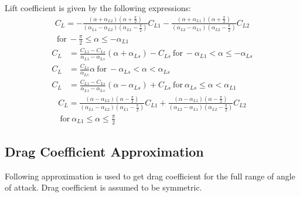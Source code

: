 Lift coefficient is given by the following expressions:
\begin{multline}
  C_L =
  -
  \frac{
    \left( \alpha + \alpha_{L2} \right)
    \left( \alpha + \frac{\pi}{2} \right) 
  }
  {
    \left( \alpha_{L1} - \alpha_{L2} \right)
    \left( \alpha_{L1} - \frac{\pi}{2} \right) 
  } C_{L1}
  -
  \frac{
    \left( \alpha + \alpha_{L1} \right)
    \left( \alpha + \frac{\pi}{2} \right)
  }
  {
    \left( \alpha_{L2} - \alpha_{L1} \right)
    \left( \alpha_{L2} - \frac{\pi}{2} \right)
  } C_{L2} \\
  \mathrm{~for~} -\frac{\pi}{2} \leq \alpha \leq - \alpha_{L1}
\end{multline}
\begin{align}
  C_L &=
  \frac{ C_{L1} - C_{Ls} }{ \alpha_{L1} - \alpha_{Ls} }
  \left( \alpha + \alpha_{Ls} \right) - C_{Ls}
  \mathrm{~for~} - \alpha_{L1} < \alpha \leq - \alpha_{Ls} \\
  C_L &= \frac{C_{Ls}}{\alpha_{Ls}} \alpha
  \mathrm{~for~} - \alpha_{Ls} < \alpha < \alpha_{Ls} \\
  C_L &=
  \frac{ C_{L1} - C_{Ls} }{ \alpha_{L1} - \alpha_{Ls} }
  \left( \alpha - \alpha_{Ls} \right) + C_{Ls}
  \mathrm{~for~} \alpha_{Ls} \leq \alpha < \alpha_{L1}
\end{align}
\begin{multline}
  C_L =
  \frac{
    \left( \alpha - \alpha_{L2} \right)
    \left( \alpha - \frac{\pi}{2} \right) 
  }
  {
    \left( \alpha_{L1} - \alpha_{L2} \right)
    \left( \alpha_{L1} - \frac{\pi}{2} \right) 
  } C_{L1}
  +
  \frac{
    \left( \alpha - \alpha_{L1} \right)
    \left( \alpha - \frac{\pi}{2} \right)
  }
  {
    \left( \alpha_{L2} - \alpha_{L1} \right)
    \left( \alpha_{L2} - \frac{\pi}{2} \right)
  } C_{L2} \\
  \mathrm{~for~} \alpha_{L1} \leq \alpha \leq \frac{\pi}{2}
\end{multline}

\subsection{Drag Coefficient Approximation}

Following approximation is used to get drag coefficient for the full range of angle of attack. \cite{NASA-TM-102267} Drag coefficient is assumed to be symmetric.

